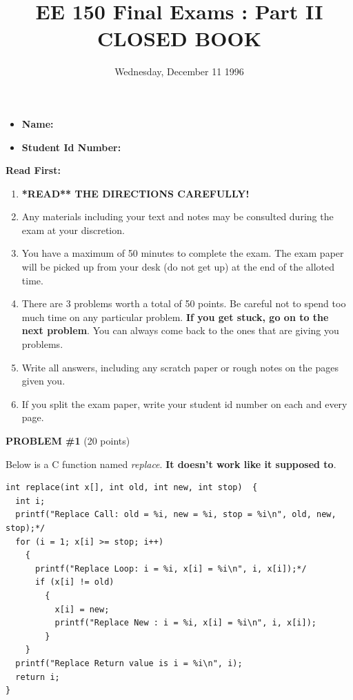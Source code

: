\setcounter{page}{1}



\title{EE 150 Final Exams : Part II \\ {\bf CLOSED BOOK}}
\author{Wednesday, December 11 1996}
\date{}
\maketitle

\begin{itemize}
\item {\bf Name:}
\item {\bf Student Id Number:}
\end{itemize} 

{\bf Read First:}
\begin{enumerate}
\item [A.] {\bf **READ** THE DIRECTIONS CAREFULLY!}
\item [B.] Any materials including your text and notes may be consulted
during the exam at your discretion. 
\item [C.] You have a maximum of 50 minutes to complete the exam.  The exam
paper will be picked up from your desk (do not get up) at the end of
the alloted time.
\item [D.] There are 3 problems worth a total of 50 points. Be careful not to
spend too much time on any particular problem.  {\bf If you get stuck,
go on to the next problem}.  You can always come back to the ones that
are giving you problems.   
\item [E.] Write all answers, including any scratch paper or rough 
notes on the pages given you.
\item [F.] If you split the exam paper, write your student id number
on each and every page.
\end{enumerate}

\pagebreak
{\bf PROBLEM \#1} (20 points)

Below is a C function named {\em replace}.  {\bf It doesn't work
like it supposed to}.

\begin{verbatim}
int replace(int x[], int old, int new, int stop)  {
  int i;
  printf("Replace Call: old = %i, new = %i, stop = %i\n", old, new, stop);*/
  for (i = 1; x[i] >= stop; i++)
    {
      printf("Replace Loop: i = %i, x[i] = %i\n", i, x[i]);*/
      if (x[i] != old)
        {
          x[i] = new;
          printf("Replace New : i = %i, x[i] = %i\n", i, x[i]);
        }
    }
  printf("Replace Return value is i = %i\n", i);
  return i;
}
\end{verbatim}

